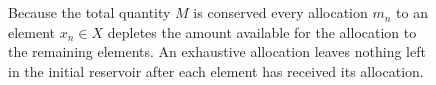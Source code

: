 \documentclass[
  letterpaper,
  DIV=11,
  numbers=noendperiod]{scrartcl}
\begin{document}
\begin{figure}
\begin{minipage}[t]{0.50\linewidth}
{{}

}

\subcaption{\label{fig-allocationd}}
\end{minipage}%
\newline
\begin{minipage}[t]{0.25\linewidth}

{\centering 

~

}

\end{minipage}%
%
\begin{minipage}[t]{0.50\linewidth}

{\centering 


}

\subcaption{\label{fig-allocatione}}
\end{minipage}%
%
\begin{minipage}[t]{0.25\linewidth}

{\centering 

~

}

\end{minipage}%

\caption{\label{fig-allocation}Because the total quantity \(M\) is
conserved every allocation \(m_{n}\) to an element \(x_{n} \in X\)
depletes the amount available for the allocation to the remaining
elements. An exhaustive allocation leaves nothing left in the initial
reservoir after each element has received its allocation.}

\end{figure}
\end{document}
